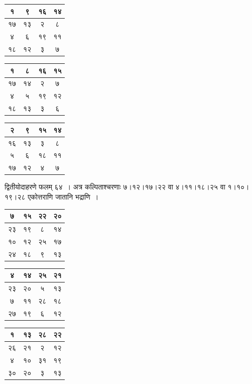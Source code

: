 \documentclass[11pt, openany]{book}
\begin{document}
\begin{table}[h]
	\setlength{\extrarowheight}{5pt} \setlength{\tabcolsep}{5pt}
	\centering	
	\begin{tabular}{|c|c|c|c|}
		\hline
		१ & ९ & १६ & १४\\
		\hline
		१७ & १३ & २ & ८\\
		\hline
		४ & ६ & १९ & ११\\
		\hline
		१८ & १२ & ३ & ७\\
		\hline
	\end{tabular}\qquad
	\begin{tabular}{|c|c|c|c|}
		\hline
		१ & ८ & १६ & १५\\
		\hline
		१७ & १४ & २ & ७\\
		\hline
		४ & ५ & १९ & १२\\
		\hline
		१८ & १३ & ३ & ६\\
		\hline
	\end{tabular}\qquad
	\begin{tabular}{|c|c|c|c|}
		\hline
		२ & ९ & १५ & १४\\
		\hline
		१६ & १३ & ३ & ८\\
		\hline
		५ & ६ & १८ & ११\\
		\hline
		१७ & १२ & ४ & ७\\
		\hline
	\end{tabular}
\end{table}

द्वितीयोदाहरणे फलम् ६४~। अत्र कल्पिताश्चरणाः ७।१२।१७।२२ वा ४।११।१८।२५ वा १।१०।१९।२८ एकोत्तराणि जातानि भद्राणि~।

\newpage

\begin{table}[h]
	\setlength{\extrarowheight}{5pt} \setlength{\tabcolsep}{5pt}
	\centering	
	\begin{tabular}{|c|c|c|c|}
		\hline
		 ७ & १५ & २२ & २०\\
		\hline
		२३ & १९ & ८ & १४\\
		\hline
		१० & १२ & २५ & १७\\
		\hline
		२४ & १८ & ९ & १३\\
		\hline
	\end{tabular}\qquad
	\begin{tabular}{|c|c|c|c|}
		\hline
		४ & १४ & २५ & २१\\
		\hline
		२३ & २० & ५ & १३\\
		\hline
		७ & ११ & २८ & १८\\
		\hline
		२७ & १९ & ६ & १२\\
		\hline
	\end{tabular}\qquad
	\begin{tabular}{|c|c|c|c|}
		\hline
		१ & १३ & २८ & २२\\
		\hline
		२६& २१ & २ & १२\\
		\hline
		४ & १० & ३१ & १९\\
		\hline
		३० & २० & ३ & १३\\
		\hline
	\end{tabular}
\end{table}
\vspace{2mm}
\end{document}
